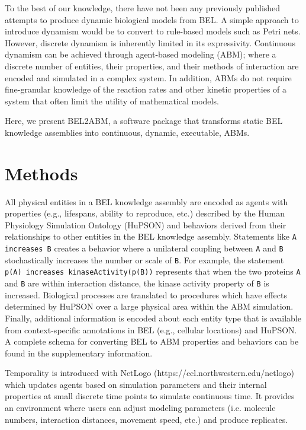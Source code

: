 \documentclass{bioinfo}
\begin{document}
To the best of our knowledge, there have not been any previously published attempts to produce dynamic biological models from BEL. A simple approach to introduce dynamism would be to convert to rule-based models such as Petri nets. However, discrete dynamism is inherently limited in its expressivity. Continuous dynamism can be achieved through agent-based 
modeling (ABM); where a discrete number of entities, their properties, and their methods of interaction 
are encoded and simulated in a complex system. In addition, ABMs do not require fine-granular knowledge of the reaction rates and other kinetic properties of a system that often limit the utility of mathematical models. 

Here, we present BEL2ABM, a software package that transforms static BEL knowledge assemblies into continuous, dynamic, executable, ABMs.

\section{Methods}

All physical entities in a BEL knowledge assembly are encoded as agents with properties 
(e.g., lifespans, ability to reproduce, etc.) described by the Human Physiology Simulation Ontology (HuPSON)
\citep{Gundel13} and behaviors derived from their relationships to other entities in the BEL knowledge assembly.
Statements like \verb|A increases B| creates a behavior where a unilateral coupling between \verb|A| and \verb|B| 
stochastically increases the number or scale of \verb|B|. For example, the statement 
\verb|p(A) increases kinaseActivity(p(B))| represents that when the two proteins \verb|A| and \verb|B| are within interaction distance, the kinase activity property of \verb|B| is increased. Biological processes are translated
to procedures which have effects determined by HuPSON over a large physical area within the ABM simulation. 
Finally, additional information is encoded about each entity type that is available from context-specific 
annotations in BEL (e.g., cellular locations) and HuPSON. A complete schema for converting BEL to ABM properties and behaviors can be found in the supplementary information. 

Temporality is introduced with NetLogo (https://ccl.northwestern.edu/netlogo) which updates agents based 
on simulation parameters and their internal properties at small discrete time points to simulate 
continuous time. It provides an environment where users can adjust modeling parameters 
(i.e. molecule numbers, interaction distances, movement speed, etc.) and produce replicates.
\end{document}
